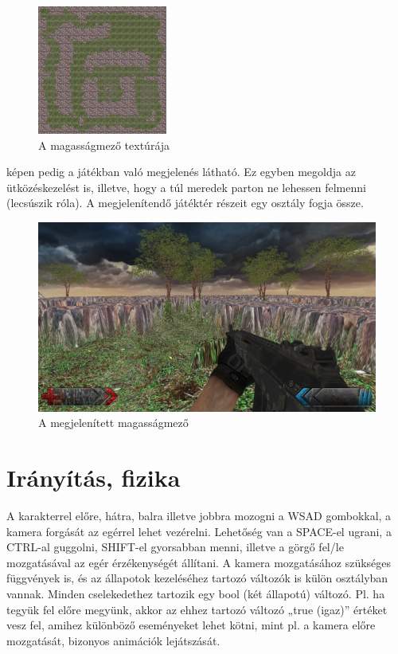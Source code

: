 \begin{figure}[h]
\centering
\includegraphics[scale=1.6]{kepek/heightmap_texture.png}
\caption{A magasságmező textúrája}
\label{fig:heightmap_texture}
\end{figure}

 képen pedig a játékban való megjelenés látható. Ez egyben megoldja az ütközéskezelést is, illetve, hogy a túl meredek parton ne lehessen felmenni (lecsúszik róla). A megjelenítendő játéktér részeit egy osztály fogja össze.

\begin{figure}[h]
\centering
\includegraphics[scale=0.4]{kepek/screenshot.png}
\caption{A megjelenített magasságmező}
\label{fig:screenshot}
\end{figure}

\section{Irányítás, fizika}

A karakterrel előre, hátra, balra illetve jobbra mozogni a WSAD gombokkal, a kamera forgását az egérrel lehet vezérelni. Lehetőség van a SPACE-el ugrani, a CTRL-al guggolni, SHIFT-el gyorsabban menni, illetve a görgő fel/le mozgatásával az egér érzékenységét állítani. A kamera mozgatásához szükséges függvények is, és az állapotok kezeléséhez tartozó változók is külön osztályban vannak. Minden cselekedethez tartozik egy bool (két állapotú) változó. Pl. ha tegyük fel előre megyünk, akkor az ehhez tartozó változó „true (igaz)” értéket vesz fel, amihez különböző eseményeket lehet kötni, mint pl. a kamera előre mozgatását, bizonyos animációk lejátszását.

